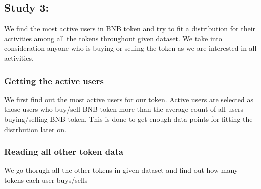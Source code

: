 \documentclass[]{article}
\newenvironment{Shaded}{\begin{snugshade}}{\end{snugshade}}
\newcommand{\KeywordTok}[1]{\textcolor[rgb]{0.13,0.29,0.53}{\textbf{#1}}}
\newcommand{\StringTok}[1]{\textcolor[rgb]{0.31,0.60,0.02}{#1}}
\newcommand{\OperatorTok}[1]{\textcolor[rgb]{0.81,0.36,0.00}{\textbf{#1}}}
\newcommand{\NormalTok}[1]{#1}
\begin{document}
\subsection{Study 3:}\label{study-3}

We find the most active users in BNB token and try to fit a distribution
for their activities among all the tokens throughout given dataset. We
take into consideration anyone who is buying or selling the token as we
are interested in all activities.

\subsubsection{Getting the active users}\label{getting-the-active-users}

We first find out the most active users for our token. Active users are
selected as those users who buy/sell BNB token more than the average
count of all users buying/selling BNB token. This is done to get enough
data points for fitting the distrbution later on.

\begin{Shaded}
\end{Shaded}

\subsubsection{Reading all other token
data}\label{reading-all-other-token-data}

We go thorugh all the other tokens in given dataset and find out how
many tokens each user buys/sells
\end{document}
